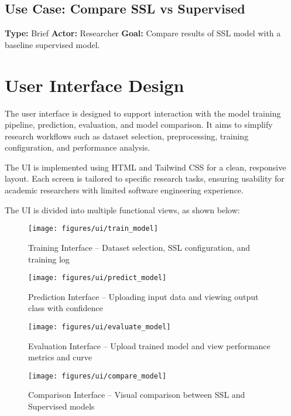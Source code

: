 \subsection*{Use Case: Compare SSL vs Supervised}
\textbf{Type:} Brief
\textbf{Actor:} Researcher
\textbf{Goal:} Compare results of SSL model with a baseline supervised model.
\newpage

\section{User Interface Design}
\label{sec:user-interface-design}

The user interface is designed to support interaction with the model training pipeline, prediction, evaluation, and model comparison.
It aims to simplify research workflows such as dataset selection, preprocessing, training configuration, and performance analysis.

The UI is implemented using HTML and Tailwind CSS for a clean, responsive layout.
Each screen is tailored to specific research tasks, ensuring usability for academic researchers with limited software engineering experience.

The UI is divided into multiple functional views, as shown below:

\begin{figure}[h]
    \centering
    \texttt{[image: figures/ui/train\_model]}
    \caption{Training Interface – Dataset selection, SSL configuration, and training log}
    \label{fig:figure2}
\end{figure}

\begin{figure}[h]
    \centering
    \texttt{[image: figures/ui/predict\_model]}
    \caption{Prediction Interface – Uploading input data and viewing output class with confidence}
    \label{fig:figure3}
\end{figure}

\begin{figure}[h]
    \centering
    \texttt{[image: figures/ui/evaluate\_model]}
    \caption{Evaluation Interface – Upload trained model and view performance metrics and curve}
    \label{fig:figure4}
\end{figure}

\begin{figure}[h]
    \centering
    \texttt{[image: figures/ui/compare\_model]}
    \caption{Comparison Interface – Visual comparison between SSL and Supervised models}
    \label{fig:figure5}
\end{figure}

